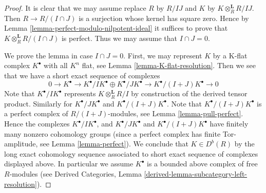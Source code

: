 \begin{proof}
It is clear that we may assume replace $R$ by $R/IJ$ and $K$ by
$K \otimes_R^\mathbf{L} R/IJ$. Then $R \to R/(I \cap J)$ is
a surjection whose kernel has square zero. Hence by
Lemma \ref{lemma-perfect-modulo-nilpotent-ideal}
it suffices to prove that $K \otimes_R^\mathbf{L} R/(I \cap J)$ is
perfect. Thus we may assume that $I \cap J = 0$.

\medskip\noindent
We prove the lemma in case $I \cap J = 0$. First, we may represent $K$
by a K-flat complex $K^\bullet$ with all $K^n$ flat, see
Lemma \ref{lemma-K-flat-resolution}. Then we see that we have a short
exact sequence of complexes
$$
0 \to
K^\bullet \to K^\bullet/IK^\bullet \oplus K^\bullet/JK^\bullet \to
K^\bullet/(I + J)K^\bullet \to 0
$$
Note that $K^\bullet/IK^\bullet$ represents $K \otimes^\mathbf{L}_R R/I$
by construction of the derived tensor product. Similarly for
$K^\bullet/JK^\bullet$ and $K^\bullet/(I + J)K^\bullet$.
Note that $K^\bullet/(I + J)K^\bullet$ is a perfect complex
of $R/(I + J)$-modules, see
Lemma \ref{lemma-pull-perfect}.
Hence the complexes $K^\bullet/IK^\bullet$, and
$K^\bullet/JK^\bullet$ and $K^\bullet/(I + J)K^\bullet$
have finitely many nonzero cohomology groups
(since a perfect complex has finite Tor-amplitude, see
Lemma \ref{lemma-perfect}). We conclude that $K \in D^b(R)$ by the
long exact cohomology sequence associated to short exact sequence
of complexes displayed above. In particular we assume $K^\bullet$
is a bounded above complex of free $R$-modules (see
Derived Categories, Lemma \ref{derived-lemma-subcategory-left-resolution}).


\end{proof}

